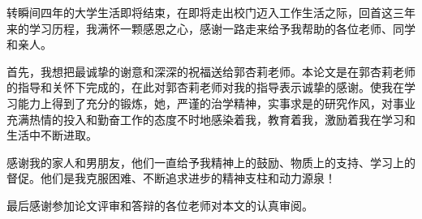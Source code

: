 \documentclass{XDBAthesis}
\begin{document}
\else
\fi
\begin{thanks}
转瞬间四年的大学生活即将结束，在即将走出校门迈入工作生活之际，回首这三年来的学习历程，我满怀一颗感恩之心，感谢一路走来给予我帮助的各位老师、同学和亲人。

首先，我想把最诚挚的谢意和深深的祝福送给郭杏莉老师。本论文是在郭杏莉老师的指导和关怀下完成的，在此对郭杏莉老师对我的指导表示诚挚的感谢。使我在学习能力上得到了充分的锻炼，她，严谨的治学精神，实事求是的研究作风，对事业充满热情的投入和勤奋工作的态度不时地感染着我，教育着我，激励着我在学习和生活中不断进取。

感谢我的家人和男朋友，他们一直给予我精神上的鼓励、物质上的支持、学习上的督促。他们是我克服困难、不断追求进步的精神支柱和动力源泉！

最后感谢参加论文评审和答辩的各位老师对本文的认真审阅。
\end{thanks}
\ifx\allfiles\undefined
%

\end{document}
